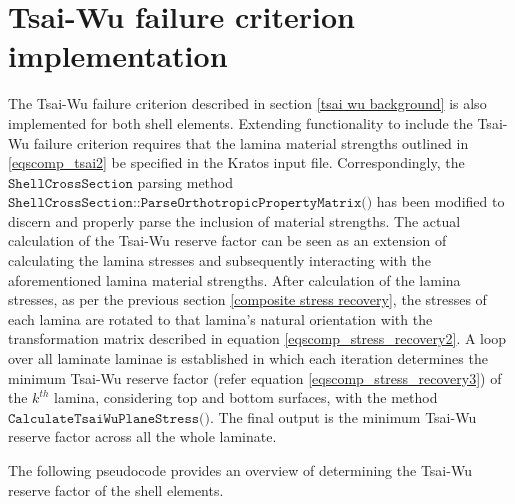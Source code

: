 \section{Tsai-Wu failure criterion implementation}
The Tsai-Wu failure criterion described in section \ref{tsai wu background} is also implemented for both shell elements. Extending functionality to include the Tsai-Wu failure criterion requires that the lamina material strengths outlined in \ref{eqscomp_tsai2} be specified in the Kratos input file. Correspondingly, the $\texttt{ShellCrossSection}$ parsing method $\texttt{ShellCrossSection::ParseOrthotropicPropertyMatrix()}$ has been modified to discern and properly parse the inclusion of material strengths. The actual calculation of the Tsai-Wu reserve factor can be seen as an extension of calculating the lamina stresses and subsequently interacting with the aforementioned lamina material strengths. After calculation of the lamina stresses, as per the previous section \ref{composite stress recovery}, the stresses of each lamina are rotated to that lamina's natural orientation with the transformation matrix described in equation \ref{eqscomp_stress_recovery2}. A loop over all laminate laminae is established in which each iteration determines the minimum Tsai-Wu reserve factor (refer equation \ref{eqscomp_stress_recovery3}) of the $k^{th}$ lamina, considering top and bottom surfaces, with the method $\texttt{CalculateTsaiWuPlaneStress()}$. The final output is the minimum Tsai-Wu reserve factor across all the whole laminate.

The following pseudocode provides an overview of determining the Tsai-Wu reserve factor of the shell elements.

